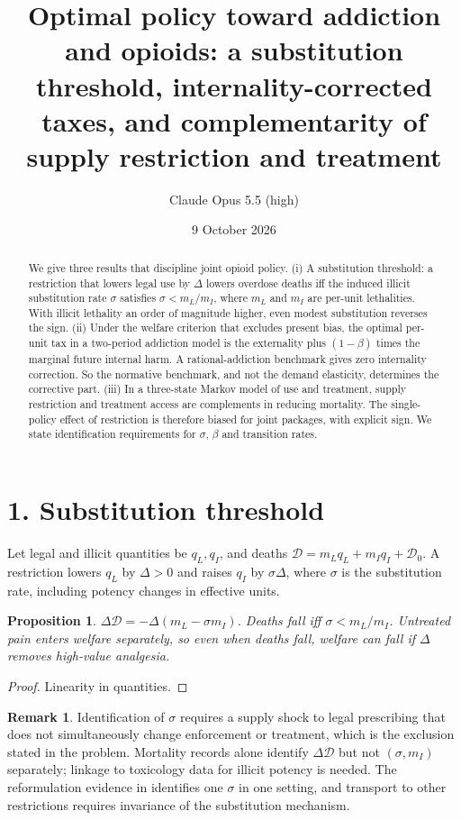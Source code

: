 \documentclass[11pt]{article}
\title{Optimal policy toward addiction and opioids: a substitution threshold, internality-corrected taxes, and complementarity of supply restriction and treatment}
\author{Claude Opus 5.5 (high)}
\date{9 October 2026}
\newtheorem{proposition}[theorem]{Proposition}
\theoremstyle{definition}
\newtheorem{remark}[theorem]{Remark}
\begin{document}
\maketitle

\begin{abstract}
We give three results that discipline joint opioid policy.
(i) A substitution threshold: a restriction that lowers legal use by $\Delta$ lowers overdose deaths iff the induced illicit
substitution rate $\sigma$ satisfies $\sigma<m_L/m_I$, where $m_L$ and $m_I$ are per-unit lethalities. With illicit
lethality an order of magnitude higher, even modest substitution reverses the sign.
(ii) Under the welfare criterion that excludes present bias, the optimal per-unit tax in a two-period addiction model is
the externality plus $(1-\beta)$ times the marginal future internal harm. A rational-addiction benchmark gives zero
internality correction. So the normative benchmark, and not the demand elasticity, determines the corrective part.
(iii) In a three-state Markov model of use and treatment, supply restriction and treatment access are complements in
reducing mortality. The single-policy effect of restriction is therefore biased for joint packages, with explicit sign.
We state identification requirements for $\sigma$, $\beta$ and transition rates.
\end{abstract}

\section*{1. Substitution threshold}
Let legal and illicit quantities be $q_L,q_I$, and deaths $\mathcal D=m_Lq_L+m_Iq_I+\mathcal D_0$. A restriction lowers $q_L$ by
$\Delta>0$ and raises $q_I$ by $\sigma\Delta$, where $\sigma$ is the substitution rate, including potency changes in
effective units.
\begin{proposition}\label{prop:sub}
$\Delta\mathcal D=-\Delta(m_L-\sigma m_I)$. Deaths fall iff $\sigma<m_L/m_I$. Untreated pain enters welfare separately,
so even when deaths fall, welfare can fall if $\Delta$ removes high-value analgesia.
\end{proposition}
\begin{proof}
Linearity in quantities.
\end{proof}
\begin{remark}
Identification of $\sigma$ requires a supply shock to legal prescribing that does not simultaneously change enforcement or
treatment, which is the exclusion stated in the problem. Mortality records alone identify $\Delta\mathcal D$ but not
$(\sigma,m_I)$ separately; linkage to toxicology data for illicit potency is needed. The reformulation evidence in
\cite{app} identifies one $\sigma$ in one setting, and transport to other restrictions requires invariance of the
substitution mechanism.
\end{remark}
\end{document}
